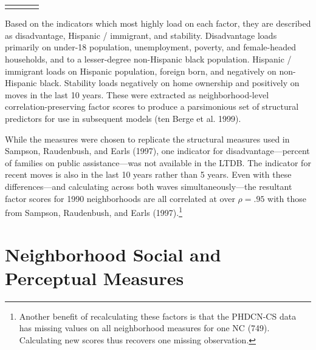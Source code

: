 \documentclass [11pt, proquest] {uwthesis}[2015/03/03]
\begin{document}
\begin{longtable}[c]{|p{2.00in}|p{1.20in}|p{1.20in}|p{1.20in}}
\noalign{\global\setlength{\arrayrulewidth}{0.5pt}}\arrayrulecolor[HTML]{000000}\cline{1-4}

\end{longtable}
Based on the indicators which most highly load on each factor, they are described as disadvantage, Hispanic / immigrant, and stability. Disadvantage loads primarily on under-18 population, unemployment, poverty, and female-headed households, and to a lesser-degree non-Hispanic black population. Hispanic / immigrant loads on Hispanic population, foreign born, and negatively on non-Hispanic black. Stability loads negatively on home ownership and positively on moves in the last 10 years. These were extracted as neighborhood-level correlation-preserving factor scores to produce a parsimonious set of structural predictors for use in subsequent models (ten Berge et al. 1999).

While the measures were chosen to replicate the structural measures used in Sampson, Raudenbush, and Earls (1997), one indicator for disadvantage---percent of families on public assistance---was not available in the LTDB. The indicator for recent moves is also in the last 10 years rather than 5 years. Even with these differences---and calculating across both waves simultaneously---the resultant factor scores for 1990 neighborhoods are all correlated at over \(\rho=.95\) with those from Sampson, Raudenbush, and Earls (1997).\footnote{Another benefit of recalculating these factors is that the PHDCN-CS data has missing values on all neighborhood measures for one NC (749). Calculating new scores thus recovers one missing observation.}

\hypertarget{neighborhood-social-and-perceptual-measures}{%
\section{Neighborhood Social and Perceptual Measures}\label{neighborhood-social-and-perceptual-measures}}
\end{document}

